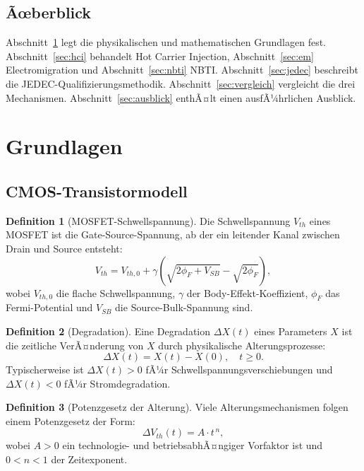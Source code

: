 ﻿\documentclass[a4paper,12pt]{article}
\theoremstyle{definition}
\newtheorem{definition}{Definition}
\begin{document}
\subsection{Ãœberblick}

Abschnitt~\ref{sec:grundlagen} legt die physikalischen und mathematischen
Grundlagen fest. Abschnitt~\ref{sec:hci} behandelt Hot Carrier Injection,
Abschnitt~\ref{sec:em} Electromigration und Abschnitt~\ref{sec:nbti} NBTI.
Abschnitt~\ref{sec:jedec} beschreibt die JEDEC-Qualifizierungsmethodik.
Abschnitt~\ref{sec:vergleich} vergleicht die drei Mechanismen.
Abschnitt~\ref{sec:ausblick} enthÃ¤lt einen ausfÃ¼hrlichen Ausblick.

\section{Grundlagen}
\label{sec:grundlagen}

\subsection{CMOS-Transistormodell}

\begin{definition}[MOSFET-Schwellspannung]
	Die Schwellspannung $V_{th}$ eines MOSFET ist die Gate-Source-Spannung,
	ab der ein leitender Kanal zwischen Drain und Source entsteht:
	\[
	V_{th} = V_{th,0} + \gamma\!\left(\sqrt{2\phi_F + V_{SB}} - \sqrt{2\phi_F}\right),
	\]
	wobei $V_{th,0}$ die flache Schwellspannung, $\gamma$ der Body-Effekt-Koeffizient,
	$\phi_F$ das Fermi-Potential und $V_{SB}$ die Source-Bulk-Spannung sind.
\end{definition}

\begin{definition}[Degradation]
	Eine Degradation $\Delta X(t)$ eines Parameters $X$ ist die zeitliche
	VerÃ¤nderung von $X$ durch physikalische Alterungsprozesse:
	\[
	\Delta X(t) = X(t) - X(0), \quad t \geq 0.
	\]
	Typischerweise ist $\Delta X(t) > 0$ fÃ¼r Schwellspannungsverschiebungen
	und $\Delta X(t) < 0$ fÃ¼r Strom\-degradation.
\end{definition}

\begin{definition}[Potenzgesetz der Alterung]
	Viele Alterungsmechanismen folgen einem Potenzgesetz der Form:
	\[
	\Delta V_{th}(t) = A \cdot t^{\,n},
	\]
	wobei $A > 0$ ein technologie- und betriebsabhÃ¤ngiger Vorfaktor ist
	und $0 < n < 1$ der Zeitexponent.
\end{definition}
\end{document}
